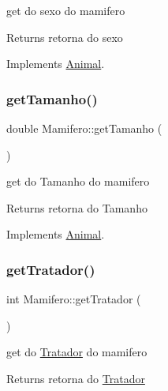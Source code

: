 get do sexo do mamifero 

\begin{DoxyReturn}{Returns}
retorna do sexo 
\end{DoxyReturn}


Implements \mbox{\hyperlink{class_animal}{Animal}}.

\mbox{\label{class_mamifero_a2f0870f33c6fba6da5784dbcb9afea8a}} 
\subsubsection{\texorpdfstring{getTamanho()}{getTamanho()}}
{\footnotesize\ttfamily double Mamifero\+::get\+Tamanho (\begin{DoxyParamCaption}{ }\end{DoxyParamCaption})\hspace{0.3cm}{\ttfamily [virtual]}}



get do Tamanho do mamifero 

\begin{DoxyReturn}{Returns}
retorna do Tamanho 
\end{DoxyReturn}


Implements \mbox{\hyperlink{class_animal}{Animal}}.

\mbox{\label{class_mamifero_a079d70495494cbd644371345462d6163}} 
\subsubsection{\texorpdfstring{getTratador()}{getTratador()}}
{\footnotesize\ttfamily int Mamifero\+::get\+Tratador (\begin{DoxyParamCaption}{ }\end{DoxyParamCaption})\hspace{0.3cm}{\ttfamily [virtual]}}



get do \mbox{\hyperlink{class_tratador}{Tratador}} do mamifero 

\begin{DoxyReturn}{Returns}
retorna do \mbox{\hyperlink{class_tratador}{Tratador}} 
\end{DoxyReturn}


